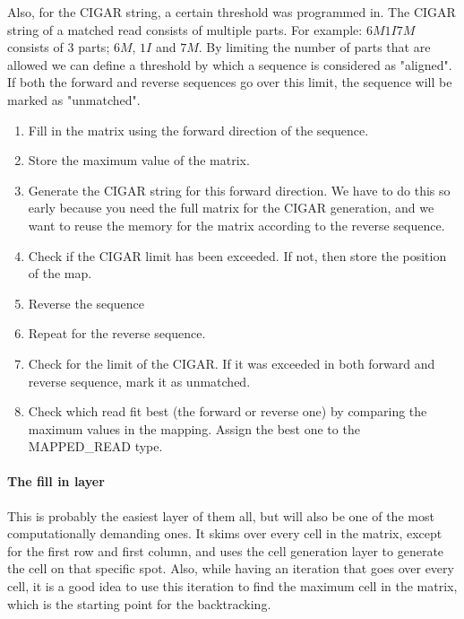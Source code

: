 Also, for the CIGAR string, a certain threshold was programmed in. The CIGAR string of a matched read consists of multiple parts. For example: $6M1I7M$ consists of 3 parts; $6M$, $1I$ and $7M$. By limiting the number of parts that are allowed we can define a threshold by which a sequence is considered as "aligned". If both the forward and reverse sequences go over this limit, the sequence will be marked as "unmatched".

\begin{enumerate}
	\item Fill in the matrix using the forward direction of the sequence.
	\item Store the maximum value of the matrix.
	\item Generate the CIGAR string for this forward direction. We have to do this so early because you need the full matrix for the CIGAR generation, and we want to reuse the memory for the matrix according to the reverse sequence.
	\item Check if the CIGAR limit has been exceeded. If not, then store the position of the map. 
	\item Reverse the sequence
	\item Repeat for the reverse sequence.
	\item Check for the limit of the CIGAR. If it was exceeded in both forward and reverse sequence, mark it as unmatched.
	\item Check which read fit best (the forward or reverse one) by comparing the maximum values in the mapping. Assign the best one to the MAPPED\_READ type.
\end{enumerate}

\paragraph{The fill in layer}
This is probably the easiest layer of them all, but will also be one of the most computationally demanding ones. It skims over every cell in the matrix, except for the first row and first column, and uses the cell generation layer to generate the cell on that specific spot. Also, while having an iteration that goes over every cell, it is a good idea to use this iteration to find the maximum cell in the matrix, which is the starting point for the backtracking.

